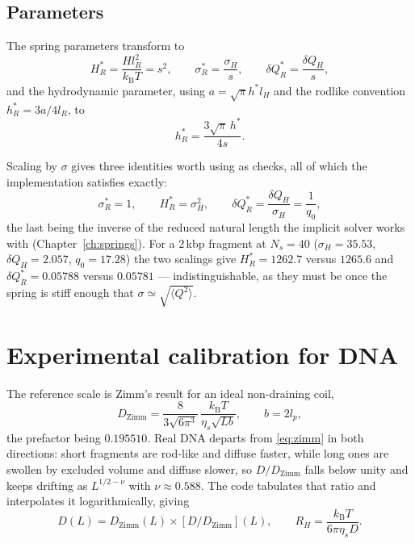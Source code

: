 \documentclass[11pt,a4paper]{report}
\newcommand{\kB}{k_\mathrm{B}}
\begin{document}
\subsection{Parameters}

The spring parameters transform to
\begin{equation}
  H^{*}_R = \frac{H l_R^{2}}{\kB T} = s^{2},
  \qquad
  \sigma^{*}_R = \frac{\sigma_H}{s},
  \qquad
  \delta Q^{*}_R = \frac{\delta Q_H}{s},
\end{equation}
and the hydrodynamic parameter, using $a = \sqrt{\pi}h^{*}l_H$ and the rodlike
convention $h^{*}_R = 3a/4l_R$, to
\begin{equation}
  h^{*}_R = \frac{3\sqrt{\pi}\,h^{*}}{4 s}.
\end{equation}

Scaling by $\sigma$ gives three identities worth using as checks, all of which the
implementation satisfies exactly:
\begin{equation}
  \sigma^{*}_R = 1,
  \qquad
  H^{*}_R = \sigma_H^{2},
  \qquad
  \delta Q^{*}_R = \frac{\delta Q_H}{\sigma_H} = \frac{1}{q_0},
\end{equation}
the last being the inverse of the reduced natural length the implicit solver works
with (Chapter~\ref{ch:springs}). For a $2$\,kbp fragment at $N_s = 40$
($\sigma_H = 35.53$, $\delta Q_H = 2.057$, $q_0 = 17.28$) the two scalings give
$H^{*}_R = 1262.7$ versus $1265.6$ and $\delta Q^{*}_R = 0.05788$ versus
$0.05781$ --- indistinguishable, as they must be once the spring is stiff enough
that $\sigma \simeq \sqrt{\langle Q^{2}\rangle}$.

\section{Experimental calibration for DNA}

The reference scale is Zimm's result for an ideal non-draining coil,
\begin{equation}
  D_{\mathrm{Zimm}} = \frac{8}{3\sqrt{6\pi^{3}}}\,
                      \frac{\kB T}{\eta_s\sqrt{L b}},
  \qquad b = 2 l_p,
  \label{eq:zimm}
\end{equation}
the prefactor being $0.195510$. Real DNA departs from \eqref{eq:zimm} in both
directions: short fragments are rod-like and diffuse faster, while long ones are
swollen by excluded volume and diffuse slower, so $D/D_{\mathrm{Zimm}}$ falls
below unity and keeps drifting as $L^{1/2-\nu}$ with $\nu\approx0.588$. The code
tabulates that ratio and interpolates it logarithmically, giving
\begin{equation}
  D(L) = D_{\mathrm{Zimm}}(L)\times\left[D/D_{\mathrm{Zimm}}\right](L),
  \qquad
  R_H = \frac{\kB T}{6\pi\eta_s D}.
\end{equation}
\end{document}

